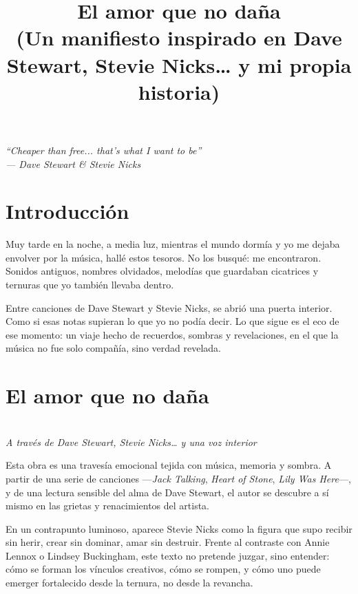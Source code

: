 \documentclass[12pt]{article}
\title{\Huge\textbf{El amor que no daña} \\ \large (Un manifiesto inspirado en Dave Stewart, Stevie Nicks… y mi propia historia)}
\author{}
\date{}
\begin{document}
	\maketitle
	\thispagestyle{empty}
	\begin{center}
		\textit{“Cheaper than free... that’s what I want to be” \\ — Dave Stewart \& Stevie Nicks}
	\end{center}
	
	\vspace{1.5cm}
	
	\section*{Introducción}
	
	Muy tarde en la noche, a media luz, mientras el mundo dormía y yo me dejaba envolver por la música, hallé estos tesoros. No los busqué: me encontraron. Sonidos antiguos, nombres olvidados, melodías que guardaban cicatrices y ternuras que yo también llevaba dentro.
	
	Entre canciones de Dave Stewart y Stevie Nicks, se abrió una puerta interior. Como si esas notas supieran lo que yo no podía decir. Lo que sigue es el eco de ese momento: un viaje hecho de recuerdos, sombras y revelaciones, en el que la música no fue solo compañía, sino verdad revelada.
	
	\section*{El amor que no daña}
	
	\begin{flushleft}
		\textbf{\large } \\
		\textit{A través de Dave Stewart, Stevie Nicks… y una voz interior}
	\end{flushleft}
	
	\vspace{0.5cm}
	
	Esta obra es una travesía emocional tejida con música, memoria y sombra. A partir de una serie de canciones —\textit{Jack Talking}, \textit{Heart of Stone}, \textit{Lily Was Here}—, y de una lectura sensible del alma de Dave Stewart, el autor se descubre a sí mismo en las grietas y renacimientos del artista.
	
	En un contrapunto luminoso, aparece Stevie Nicks como la figura que supo recibir sin herir, crear sin dominar, amar sin destruir. Frente al contraste con Annie Lennox o Lindsey Buckingham, este texto no pretende juzgar, sino entender: cómo se forman los vínculos creativos, cómo se rompen, y cómo uno puede emerger fortalecido desde la ternura, no desde la revancha.
	
\end{document}
